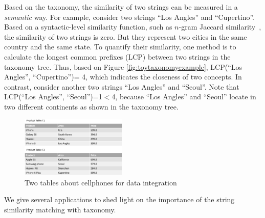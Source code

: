 Based on the taxonomy,  the similarity of two strings can be measured in a \textit{semantic} way. For example, consider two strings ``\textsf{Los Angles}'' and ``\textsf{Cupertino}''. Based on a syntactic-level similarity function, such as $n$-gram Jaccard similarity~\cite{conf/icde/ChaudhuriGK06,conf/icde/LiLL08}, the similarity of two strings is zero. But they represent two cities in the same country and the same state. To quantify their similarity, one method is to calculate the longest common prefixes (LCP) between two strings in the taxonomy tree. Thus, based on Figure \ref{fig:toytaxonomyexample}, LCP(``\textsf{Los Angles}'', ``\textsf{Cupertino}'')= 4, which indicates the closeness of two concepts. In contrast, consider another two strings
 ``\textsf{Los Angles}'' and ``\textsf{Seoul}''. Note that LCP(``\textsf{Los Angles}'', ``\textsf{Seoul}'')=1$<$4, because ``\textsf{Los Angles}'' and ``\textsf{Seoul}'' locate in two different continents as shown in the taxonomy tree.


\begin{figure}[t]
\centering
\includegraphics[width=0.45\textwidth]{figures/productexample}
 \caption{Two tables about cellphones for data integration}
\label{fig:twotables}
\end{figure}

We give several applications to shed light on the importance of the  string similarity matching with taxonomy.

